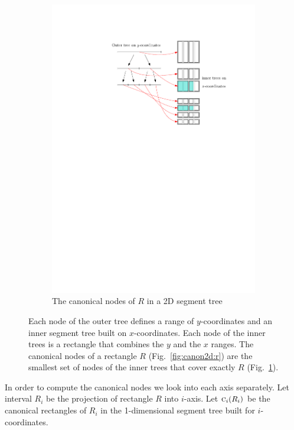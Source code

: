 \documentclass[english,gradu]{tktltiki2018}
\begin{document}
\begin{figure}
\begin{subfigure}[t]{0.75\textwidth}
		\includegraphics[width=\textwidth,page=1]{fig/segtree2d}
		\caption{The canonical nodes of $R$ in a 2D segment tree}\label{fig:canon2d:tree}
	\end{subfigure}
	\caption{Each node of the outer tree defines a range of $y$-coordinates and an inner segment tree built on $x$-coordinates.
	Each node of the inner trees is a rectangle that combines the $y$ and the $x$ ranges.
	The canonical nodes of a rectangle $R$ (Fig.~\ref{fig:canon2d:r}) are the smallest set of nodes of the inner trees that cover exactly $R$ (Fig.~\ref{fig:canon2d:tree}).}\label{fig:canon2d}
\end{figure}

In order to compute the canonical nodes we look into each axis separately.
Let interval $R_i$ be the projection of rectangle $R$ into $i$-axis.
Let $\canoni{R_i}{i}$ be the canonical rectangles of $R_i$ in the 1-dimensional segment tree built for $i$-coordinates.
\end{document}
